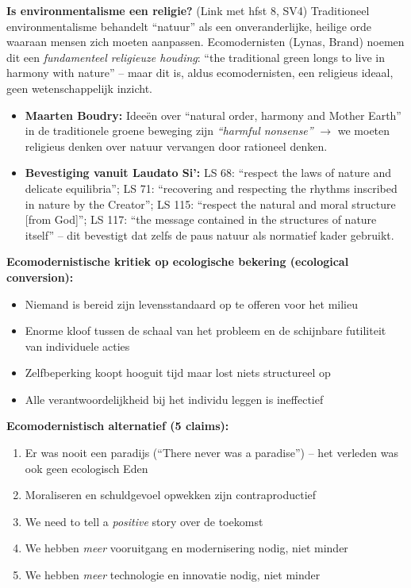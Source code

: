\documentclass[a4paper,10pt]{article}
\begin{document}
\textbf{Is environmentalisme een religie?} (Link met hfst 8, SV4)
Traditioneel environmentalisme behandelt ``natuur'' als een onveranderlijke, heilige orde waaraan mensen zich moeten aanpassen. Ecomodernisten (Lynas, Brand) noemen dit een \textit{fundamenteel religieuze houding}: ``the traditional green longs to live in harmony with nature'' -- maar dit is, aldus ecomodernisten, een religieus ideaal, geen wetenschappelijk inzicht.
\begin{itemize}[noitemsep]
  \item \textbf{Maarten Boudry:} Ideeën over ``natural order, harmony and Mother Earth'' in de traditionele groene beweging zijn \textit{``harmful nonsense''} $\to$ we moeten religieus denken over natuur vervangen door rationeel denken.
  \item \textbf{Bevestiging vanuit Laudato Si':} LS 68: ``respect the laws of nature and delicate equilibria''; LS 71: ``recovering and respecting the rhythms inscribed in nature by the Creator''; LS 115: ``respect the natural and moral structure [from God]''; LS 117: ``the message contained in the structures of nature itself'' -- dit bevestigt dat zelfs de paus natuur als normatief kader gebruikt.
\end{itemize}

\textbf{Ecomodernistische kritiek op ecologische bekering (ecological conversion):}
\begin{itemize}[noitemsep]
  \item Niemand is bereid zijn levensstandaard op te offeren voor het milieu
  \item Enorme kloof tussen de schaal van het probleem en de schijnbare futiliteit van individuele acties
  \item Zelfbeperking koopt hooguit tijd maar lost niets structureel op
  \item Alle verantwoordelijkheid bij het individu leggen is ineffectief
\end{itemize}

\textbf{Ecomodernistisch alternatief (5 claims):}
\begin{enumerate}[noitemsep]
  \item Er was nooit een paradijs (``There never was a paradise'') -- het verleden was ook geen ecologisch Eden
  \item Moraliseren en schuldgevoel opwekken zijn contraproductief
  \item We need to tell a \textit{positive} story over de toekomst
  \item We hebben \textit{meer} vooruitgang en modernisering nodig, niet minder
  \item We hebben \textit{meer} technologie en innovatie nodig, niet minder
\end{enumerate}
\end{document}
